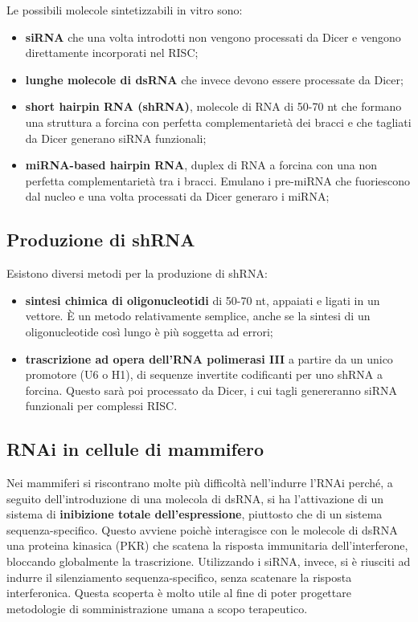 \documentclass[11pt]{book}
\begin{document}
Le possibili molecole sintetizzabili in vitro sono:

\begin{itemize}
\itemsep1pt\parskip0pt
\item
  \textbf{siRNA} che una volta introdotti non vengono processati da
  Dicer e vengono direttamente incorporati nel RISC;
\item
  \textbf{lunghe molecole di dsRNA} che invece devono essere processate
  da Dicer;
\item
  \textbf{short hairpin RNA (shRNA)}, molecole di RNA di 50-70 nt che
  formano una struttura a forcina con perfetta complementarietà dei
  bracci e che tagliati da Dicer generano siRNA funzionali;
\item
  \textbf{miRNA-based hairpin RNA}, duplex di RNA a forcina con una non
  perfetta complementarietà tra i bracci. Emulano i pre-miRNA che
  fuoriescono dal nucleo e una volta processati da Dicer generaro i
  miRNA;
\end{itemize}

\subsection{Produzione di shRNA}\label{produzione-di-shrna}

Esistono diversi metodi per la produzione di shRNA:

\begin{itemize}
\itemsep1pt\parskip0pt
\item
  \textbf{sintesi chimica di oligonucleotidi} di 50-70 nt, appaiati e
  ligati in un vettore. È un metodo relativamente semplice, anche se la
  sintesi di un oligonucleotide così lungo è più soggetta ad errori;
\item
  \textbf{trascrizione ad opera dell'RNA polimerasi III} a partire da un
  unico promotore (U6 o H1), di sequenze invertite codificanti per uno
  shRNA a forcina. Questo sarà poi processato da Dicer, i cui tagli
  genereranno siRNA funzionali per complessi RISC.
\end{itemize}

\subsection{RNAi in cellule di
mammifero}\label{rnai-in-cellule-di-mammifero}

Nei mammiferi si riscontrano molte più difficoltà nell'indurre l'RNAi
perché, a seguito dell'introduzione di una molecola di dsRNA, si ha
l'attivazione di un sistema di \textbf{inibizione totale
dell'espressione}, piuttosto che di un sistema sequenza-specifico.
Questo avviene poichè interagisce con le molecole di dsRNA una proteina
kinasica (PKR) che scatena la risposta immunitaria dell'interferone,
bloccando globalmente la trascrizione. Utilizzando i siRNA, invece, si è
riusciti ad indurre il silenziamento sequenza-specifico, senza scatenare
la risposta interferonica. Questa scoperta è molto utile al fine di
poter progettare metodologie di somministrazione umana a scopo
terapeutico.
\end{document}
